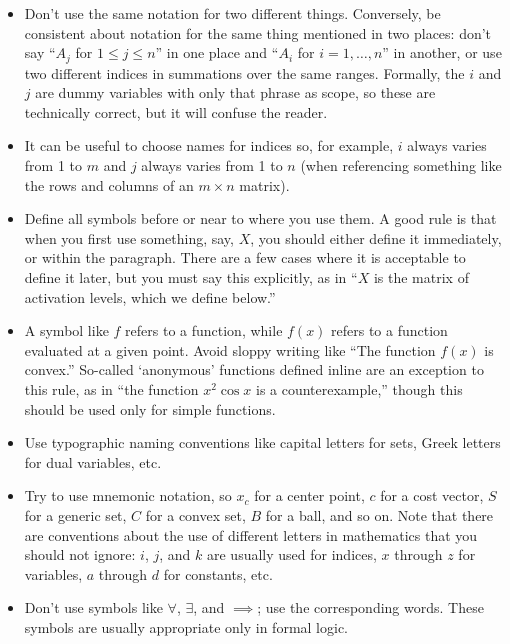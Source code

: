 \documentclass{article}
\begin{document}
\begin{itemize}
\item Don't use the same notation for two different things. 
    Conversely, be consistent about notation for the same thing mentioned in two places: don't say ``$A_j$ for $1 \leq j \leq n$'' in one place and ``$A_i$ for $i=1,\ldots,n$''  in another, or use two different indices in summations over the same ranges. 
    Formally, the $i$ and $j$ are dummy variables with only that phrase as scope, so these are technically correct, but it will confuse the reader.

\item It can be useful to choose names for indices so, for example, $i$ always varies from 1 to $m$ and $j$ always varies from 1 to $n$ (when referencing something like the rows and columns of an $m \times n$ matrix).

\item Define all symbols before or near to where you use them.  
    A good rule is that when you first use something, say, $X$, you should either define it immediately, or within the paragraph. 
    There are a few cases where it is acceptable to define it later, but you must say this explicitly, as in ``$X$ is the matrix of activation levels, which we define below.''

\item A symbol like $f$ refers to a function, while $f(x)$ refers to a function evaluated at a given point. 
    Avoid sloppy writing like ``The function $f(x)$ is convex.'' 
    So-called `anonymous' functions defined inline are an exception to this rule, as in ``the function $x^2 \cos x$ is a counterexample,'' though this should be used only for simple functions.

\item Use typographic naming conventions like capital letters for sets, Greek letters for dual variables, etc.

\item Try to use mnemonic notation, so $x_c$ for a center point, $c$ for a cost vector, $S$ for a generic set, $C$ for a convex set, $B$ for a ball, and so on. 
    Note that there are conventions about the use of different letters in mathematics that you should not ignore: $i$, $j$, and $k$ are usually used for indices, $x$ through $z$ for variables, $a$ through $d$ for constants, etc.

\item Don't use symbols like $\forall$, $\exists$, and $\implies$; use the corresponding words. 
    These symbols are usually appropriate only in formal logic. 


\end{itemize}
\end{document}
